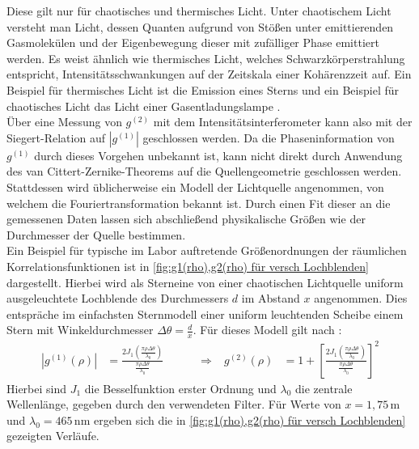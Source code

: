 Diese gilt nur für chaotisches und thermisches Licht. 
Unter chaotischem Licht versteht man Licht, dessen Quanten aufgrund von Stößen unter emittierenden Gasmolekülen und der Eigenbewegung dieser mit zufälliger Phase emittiert werden. 
Es weist ähnlich wie thermisches Licht, welches Schwarzkörperstrahlung entspricht, Intensitätsschwankungen auf der Zeitskala einer Kohärenzzeit auf. 
Ein Beispiel für thermisches Licht ist die Emission eines Sterns und ein Beispiel für chaotisches Licht das Licht einer Gasentladungslampe \cite{foxQuantumOpticsIntroduction2006}. \\
Über eine Messung von $g^{(2)}$ mit dem Intensitätsinterferometer kann also mit der Siegert-Relation auf $\left|g^{(1)}\right|$ geschlossen werden. 
Da die Phaseninformation von $g^{(1)}$ durch dieses Vorgehen unbekannt ist, kann nicht direkt durch Anwendung des van Cittert-Zernike-Theorems auf die Quellengeometrie geschlossen werden. 
Stattdessen wird üblicherweise ein Modell der Lichtquelle angenommen, von welchem die Fouriertransformation bekannt ist. 
Durch einen Fit dieser an die gemessenen Daten lassen sich abschließend physikalische Größen wie der Durchmesser der Quelle bestimmen. \\
Ein Beispiel für typische im Labor auftretende Größenordnungen der räumlichen Korrelationsfunktionen ist in \autoref{fig:g1(rho),g2(rho) für versch Lochblenden} dargestellt. 
Hierbei wird als \glqq Stern\grqq\;eine von einer chaotischen Lichtquelle uniform ausgeleuchtete Lochblende des Durchmessers $d$ im Abstand $x$ angenommen. 
Dies entspräche im einfachsten Sternmodell einer uniform leuchtenden Scheibe einem Stern mit Winkeldurchmesser $\Delta \theta = \frac{d}{x}$. 
Für dieses Modell gilt nach \cite[Kap. 4.1]{brownIntensityInterferometerIts1974}:
\begin{align}
    \left| g^{(1)}(\rho)\right| &= \frac{2J_1\left(\frac{\pi\rho\Delta\theta}{\lambda_0}\right)}{\frac{\pi\rho\Delta\theta}{\lambda_0}}\quad\quad\quad \Rightarrow & g^{(2)}(\rho) &= 1 + \left[\frac{2J_1\left(\frac{\pi\rho\Delta\theta}{\lambda_0}\right)}{\frac{\pi\rho\Delta\theta}{\lambda_0}}\right]^2
\end{align}
Hierbei sind $J_1$ die Besselfunktion erster Ordnung und $\lambda_0$ die zentrale Wellenlänge, gegeben durch den verwendeten Filter. 
Für Werte von $x=1{,}75\,\mathrm{m}$ und $\lambda_0=465\,\mathrm{nm}$ ergeben sich die in \autoref{fig:g1(rho),g2(rho) für versch Lochblenden} gezeigten Verläufe. 
